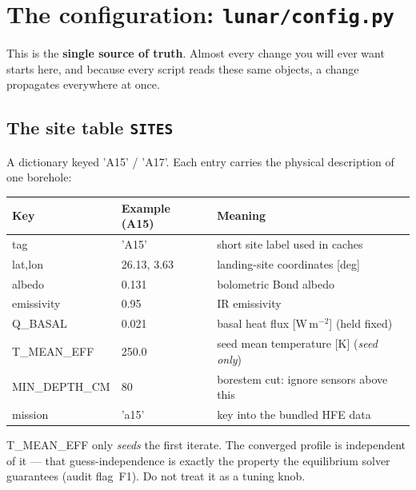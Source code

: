 \documentclass[11pt]{report}
\newcommand{\code}[1]{{\ttfamily\small #1}}
\begin{document}
\chapter{The configuration: \texttt{lunar/config.py}}

This is the \textbf{single source of truth}. Almost every change you will
ever want starts here, and because every script reads these same objects,
a change propagates everywhere at once.

\section{The site table \texttt{SITES}}

A dictionary keyed \code{'A15'} / \code{'A17'}. Each entry carries the
physical description of one borehole:

\begin{center}\small
\begin{tabular}{@{}llp{7.6cm}@{}}
\toprule
Key & Example (A15) & Meaning \\
\midrule
\code{tag} & \code{'A15'} & short site label used in caches \\
\code{lat},\code{lon} & 26.13, 3.63 & landing-site coordinates [deg] \\
\code{albedo} & 0.131 & bolometric Bond albedo \\
\code{emissivity} & 0.95 & IR emissivity \\
\code{Q\_BASAL} & 0.021 & basal heat flux [W\,m$^{-2}$] (held fixed) \\
\code{T\_MEAN\_EFF} & 250.0 & seed mean temperature [K] (\emph{seed only}) \\
\code{MIN\_DEPTH\_CM} & 80 & borestem cut: ignore sensors above this \\
\code{mission} & \code{'a15'} & key into the bundled HFE data \\
\bottomrule
\end{tabular}
\end{center}

\begin{gotcha}
\code{T\_MEAN\_EFF} only \emph{seeds} the first iterate. The converged
profile is independent of it --- that guess-independence is exactly the
property the equilibrium solver guarantees (audit flag~F1). Do not treat
it as a tuning knob.
\end{gotcha}
\end{document}
